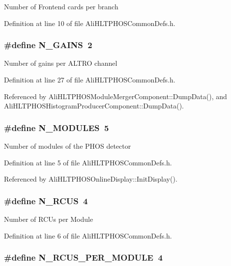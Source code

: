 Number of Frontend cards per branch 

Definition at line 10 of file Ali\-HLTPHOSCommon\-Defs.h.
\subsubsection{\setlength{\rightskip}{0pt plus 5cm}\#define N\_\-GAINS\ 2}\label{AliHLTPHOSCommonDefs_8h_a17}


Number of gains per ALTRO channel 

Definition at line 27 of file Ali\-HLTPHOSCommon\-Defs.h.

Referenced by Ali\-HLTPHOSModule\-Merger\-Component::Dump\-Data(), and Ali\-HLTPHOSHistogram\-Producer\-Component::Dump\-Data().
\subsubsection{\setlength{\rightskip}{0pt plus 5cm}\#define N\_\-MODULES\ 5}\label{AliHLTPHOSCommonDefs_8h_a0}


Number of modules of the PHOS detector 

Definition at line 5 of file Ali\-HLTPHOSCommon\-Defs.h.

Referenced by Ali\-HLTPHOSOnline\-Display::Init\-Display().
\subsubsection{\setlength{\rightskip}{0pt plus 5cm}\#define N\_\-RCUS\ 4}\label{AliHLTPHOSCommonDefs_8h_a1}


Number of RCUs per Module 

Definition at line 6 of file Ali\-HLTPHOSCommon\-Defs.h.
\subsubsection{\setlength{\rightskip}{0pt plus 5cm}\#define N\_\-RCUS\_\-PER\_\-MODULE\ 4}\label{AliHLTPHOSCommonDefs_8h_a2}


